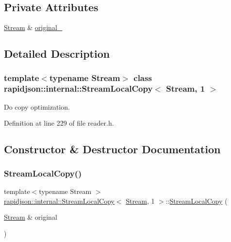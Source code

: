 \subsection*{Private Attributes}
\begin{DoxyCompactItemize}
\item 
\mbox{\hyperlink{classrapidjson_1_1_stream}{Stream}} \& \mbox{\hyperlink{classrapidjson_1_1internal_1_1_stream_local_copy_3_01_stream_00_011_01_4_a3b73b7aa82e8514ed165d0abc89c3137}{original\+\_\+}}
\end{DoxyCompactItemize}


\subsection{Detailed Description}
\subsubsection*{template$<$typename Stream$>$\newline
class rapidjson\+::internal\+::\+Stream\+Local\+Copy$<$ Stream, 1 $>$}

Do copy optimization. 

Definition at line 229 of file reader.\+h.



\subsection{Constructor \& Destructor Documentation}
\mbox{\label{classrapidjson_1_1internal_1_1_stream_local_copy_3_01_stream_00_011_01_4_a2146c126669af41f0ebb019966266a81}} 
\subsubsection{\texorpdfstring{StreamLocalCopy()}{StreamLocalCopy()}}
{\footnotesize\ttfamily template$<$typename Stream $>$ \\
\mbox{\hyperlink{classrapidjson_1_1internal_1_1_stream_local_copy}{rapidjson\+::internal\+::\+Stream\+Local\+Copy}}$<$ \mbox{\hyperlink{classrapidjson_1_1_stream}{Stream}}, 1 $>$\+::\mbox{\hyperlink{classrapidjson_1_1internal_1_1_stream_local_copy}{Stream\+Local\+Copy}} (\begin{DoxyParamCaption}\item[{\mbox{\hyperlink{classrapidjson_1_1_stream}{Stream}} \&}]{original }\end{DoxyParamCaption})}



